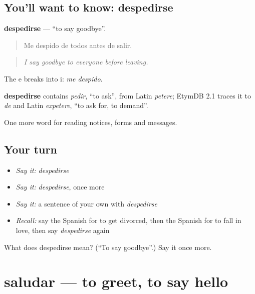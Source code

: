 \subsection*{You'll want to know: despedirse}
\textbf{despedirse} — \textquotedblleft{}to say goodbye\textquotedblright{}.

\begin{quote}
Me despido de todos antes de salir.
\end{quote}

\begin{quote}
\emph{I say goodbye to everyone before leaving.}
\end{quote}

The e breaks into i: \emph{me despido}.

\begin{cousinweb}
\textbf{despedirse} contains \emph{pedir}, \textquotedblleft{}to ask\textquotedblright{}, from Latin \emph{petere}; EtymDB 2.1 traces it to \emph{de} and Latin \emph{expetere}, \textquotedblleft{}to ask for, to demand\textquotedblright{}.
\end{cousinweb}

\begin{grammarlens}[title={What you've built}]
One more word for reading notices, forms and messages.
\end{grammarlens}

\subsection*{Your turn}
\begin{itemize}
\raggedright
  \item \emph{Say it:} \emph{despedirse}
  \item \emph{Say it:} \emph{despedirse}, once more
  \item \emph{Say it:} a sentence of your own with \emph{despedirse}
  \item \emph{Recall:} say the Spanish for to get divorced, then the Spanish for to fall in love, then say \emph{despedirse} again
\end{itemize}

\begin{tcolorbox}[breakable,colback=teal!4,colframe=teal!35!black,title={Before you move on}]
What does despedirse mean? (\textquotedblleft{}To say goodbye\textquotedblright{}.) Say it once more.
\end{tcolorbox}
\section[saludar]{saludar — to greet, to say hello}

